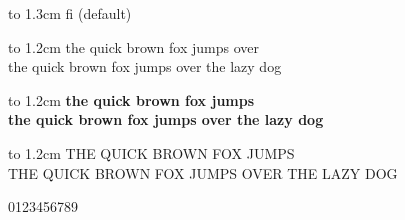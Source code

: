 \documentclass[10pt]{article}
\begin{document}
\vbox to 1.3cm{ %
{\LARGE fi} (default)\\
\selectfont {\LARGE fi} %
}

\vbox to 1.2cm{
the quick brown fox jumps over\\
\selectfont the quick brown fox jumps over the lazy dog
}

\vbox to 1.2cm{
\bfseries the quick brown fox jumps\\
\selectfont \bfseries the quick brown fox jumps over the lazy dog
}

\vbox to 1.2cm{
THE QUICK BROWN FOX JUMPS\\
\selectfont THE QUICK BROWN FOX JUMPS OVER THE LAZY DOG
}

\vbox{
0123456789 
}
\end{document}
